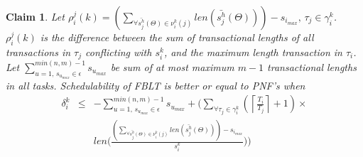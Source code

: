 \documentclass[conference]{IEEEtran}
\newtheorem{clm}{Claim}
\begin{document}
%
\begin{clm}\label{clm:fblt_pnf_edf}
Let $\rho_{i}^{j}(k)=\left(\sum_{\forall\bar{s_{j}^{h}}(\Theta)\in\nu_{i}^{k}(j)}len\left(\bar{s_{j}^{h}}(\Theta)\right)\right)-s_{i_{max}},\,\tau_{j}\in\gamma_{i}^{k}$. $\rho_{i}^{j}(k)$ is the difference between the sum of transactional
lengths of all transactions in $\tau_{j}$ conflicting with $s_{i}^{k}$,
and the maximum length transaction in $\tau_{i}$. Let $\sum_{u=1,\, s_{u_{max}}\in\epsilon}^{min(n,m)-1}s_{u_{max}}$ be sum of at most maximum $m-1$ transactional lengths in all tasks. Schedulability of FBLT is better or equal to PNF's when 
\begin{eqnarray*}
\delta_{i}^{k} & \le & - \sum_{u=1,\, s_{u_{max}}\in\epsilon}^{min(n,m)-1}s_{u_{max}}+\Bigg(\sum_{\forall\tau_{j}\in\gamma_{i}^{k}}\left(\left\lceil \frac{T_{i}}{T_{j}}\right\rceil +1\right)\times\nonumber\\
& & len\Bigg(\frac{\left(\sum_{\forall\bar{s_{j}^{h}}(\Theta)\in\nu_{i}^{k}(j)}len\left(\bar{s_{j}^{h}}(\Theta)\right)\right)-s_{i_{max}}}{s_i^k}\Bigg)\Bigg) \label{eq:fblt_pnf_comparison_1-1-1-1_mod}
\end{eqnarray*}

\end{clm}
%
\end{document}
